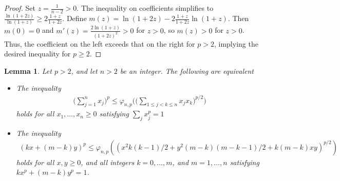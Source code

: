 \documentclass[11pt]{article}
\newtheorem{lemma}[theorem]{Lemma}
\newtheorem{corollary}[theorem]{Corollary}
\theoremstyle{definition}
\newcommand{\1}{\mathbf{1}}
\begin{document}
\begin{proof}
Set $z = \frac{1}{n-2} > 0$. The inequality on coefficients simplifies to $\frac{ \ln(1 + 2z) }{ \ln(1 + z) } \geq 2 \frac{1 + z}{1 + 2z}$. Define $m(z) = \ln(1 + 2z) - 2 \frac{1 + z}{1 + 2z} \ln(1 + z)$. Then $m(0) = 0$ and $m'(z) = \frac{2 \ln(1 + z)}{(1 + 2z)^2} > 0$ for $z > 0$, so $m(z) > 0$ for $z > 0$. Thus, the coefficient on the left exceeds that on the right for $p > 2$, implying the desired inequality for $p \geq 2$.
\end{proof}



\begin{lemma}\label{teknika1}
    Let $p>2$, and let $n>2$ be an integer. The following are equivalent
\begin{itemize}
    \item[\textup{(i)}] The inequality   \begin{align}\label{utoloba1}
        \Big(\sum_{j=1}^{n} x_{j}\Big)^{p} \leq  \varphi_{n,p}\Big(\Big(\sum_{1\leq j<k\leq n} x_{j}x_{k}\Big)^{p/2}\Big) 
    \end{align}
    holds for all $x_{1}, \ldots, x_{n}\geq 0$ satisfying $\sum_{j} x_{j}^{p}=1$
    \item[\textup{(ii)}] The inequality 
    \begin{align*}
    (kx+(m-k)y)^{p} \leq \varphi_{n,p} \left((x^{2}k(k-1)/2+y^{2}(m-k)(m-k-1)/2+k(m-k)xy)^{p/2}\right) 
\end{align*}
holds for all $x,y\geq 0$, and all integers $k=0, \ldots, m$, and $m=1, \ldots, n$  satisfying $kx^{p}+(m-k)y^{p}=1$.
\end{itemize}

\end{lemma}
\end{document}
